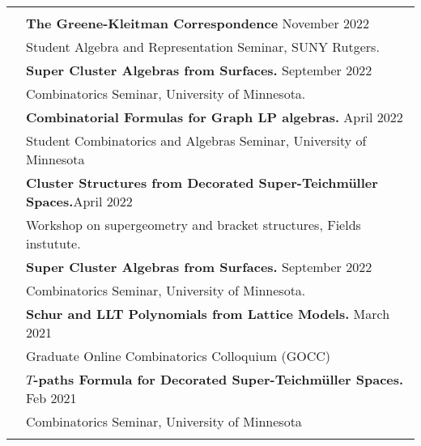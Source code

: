 \documentclass[letterpaper, 11pt,times]{article}
\newcommand{\mycolor}[0]{\color{RoyalBlue}}
\newlength{\myl}
\newcommand{\ind}[0]{\hspace{\myl}}
\newlength{\newl}
\newcommand{\paper}[2]{
\settowidth{\newl}{\textbf{#1. \ }}
\noindent
\hspace{\dimexpr\myl - \newl}
\textbf{#1. #2}
}
\begin{document}
\begin{longtable}{p{1in}p{5in}}




&\\

{\mycolor{Invited Talks}} 
& \textbf{The Greene-Kleitman Correspondence} \hfill November 2022 \\
&\ind  Student Algebra and Representation Seminar, SUNY Rutgers. \\
& \textbf{Super Cluster Algebras from Surfaces.} \hfill September 2022 \\
&\ind  Combinatorics Seminar, University of Minnesota. \\
& \textbf{Combinatorial Formulas for Graph LP algebras.} \hfill April 2022 \\
&\ind  Student Combinatorics and Algebras Seminar, University of Minnesota\\
& \textbf{Cluster Structures from Decorated Super-Teichm\"uller Spaces.}\hfill April 2022\\
&\ind Workshop on supergeometry and bracket structures, Fields instutute.\\
& \textbf{Super Cluster Algebras from Surfaces.} \hfill September 2022 \\
&\ind  Combinatorics Seminar, University of Minnesota. \\

& \textbf{Schur and LLT Polynomials from Lattice Models.} \hfill March 2021 \\
&\ind  Graduate Online Combinatorics Colloquium (GOCC) \\
& \textbf{$T$-paths Formula for Decorated Super-Teichm\"uller Spaces.} \hfill Feb 2021 \\
&\ind  Combinatorics Seminar, University of Minnesota \\

& \\


\end{longtable}
\end{document}

